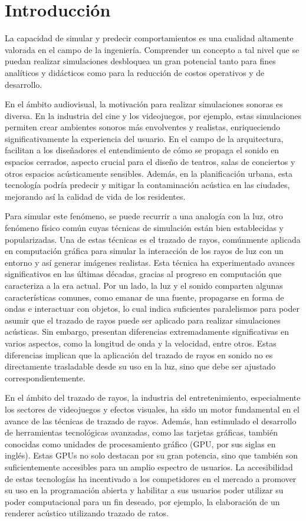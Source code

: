 \documentclass{prgrado}
\begin{document}
\chapter{Introducción}

La capacidad de simular y predecir comportamientos es una cualidad altamente valorada en el campo de la ingeniería. Comprender un concepto a tal nivel que se puedan realizar simulaciones desbloquea un gran potencial tanto para fines analíticos y didácticos como para la reducción de costos operativos y de desarrollo. 


En el ámbito audiovisual, la motivación para realizar simulaciones sonoras es diversa. En la industria del cine y los videojuegos, por ejemplo, estas simulaciones permiten crear ambientes sonoros más envolventes y realistas, enriqueciendo significativamente la experiencia del usuario. En el campo de la arquitectura, facilitan a los diseñadores el entendimiento de cómo se propaga el sonido en espacios cerrados, aspecto crucial para el diseño de teatros, salas de conciertos y otros espacios acústicamente sensibles. Además, en la planificación urbana, esta tecnología podría predecir y mitigar la contaminación acústica en las ciudades, mejorando así la calidad de vida de los residentes.


Para simular este fenómeno, se puede recurrir a una analogía con la luz, otro fenómeno físico común cuyas técnicas de simulación están bien establecidas y popularizadas. Una de estas técnicas es el trazado de rayos, comúnmente aplicada en computación gráfica para simular la interacción de los rayos de luz con un entorno y así generar imágenes realistas. Esta técnica ha experimentado avances significativos en las últimas décadas, gracias al progreso en computación que caracteriza a la era actual. Por un lado, la luz y el sonido comparten algunas características comunes, como emanar de una fuente, propagarse en forma de ondas e interactuar con objetos, lo cual indica suficientes paralelismos para poder asumir que el trazado de rayos puede ser aplicado para realizar simulaciones acústicas. Sin embargo, presentan diferencias extremadamente significativas en varios aspectos, como la longitud de onda y la velocidad, entre otros. Estas diferencias implican que la aplicación del trazado de rayos en sonido no es directamente trasladable desde su uso en la luz, sino que debe ser ajustado correspondientemente.


En el ámbito del trazado de rayos, la industria del entretenimiento, especialmente los sectores de videojuegos y efectos visuales, ha sido un motor fundamental en el avance de las técnicas de trazado de rayos. Además, han estimulado el desarrollo de herramientas tecnológicas avanzadas, como las tarjetas gráficas, también conocidas como unidades de procesamiento gráfico (GPU, por sus siglas en inglés). Estas GPUs no solo destacan por su gran potencia, sino que también son suficientemente accesibles para un amplio espectro de usuarios. La accesibilidad de estas tecnologías ha incentivado a los competidores en el mercado a promover su uso en la programación abierta y habilitar a sus usuarios poder utilizar su poder computacional para un fin deseado, por ejemplo, la elaboración de un renderer acústico utilizando trazado de ratos.
\end{document}
